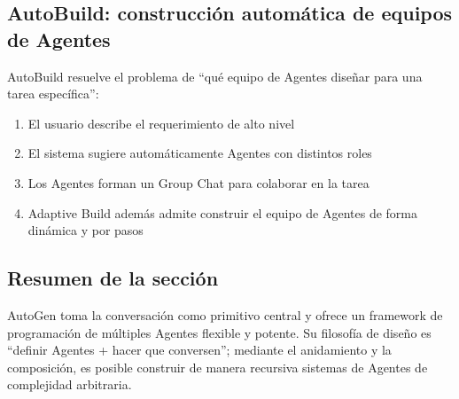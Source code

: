 \subsection{AutoBuild: construcción automática de equipos de Agentes}

AutoBuild resuelve el problema de ``qué equipo de Agentes diseñar para una tarea específica'':
\begin{enumerate}
    \item El usuario describe el requerimiento de alto nivel
    \item El sistema sugiere automáticamente Agentes con distintos roles
    \item Los Agentes forman un Group Chat para colaborar en la tarea
    \item Adaptive Build además admite construir el equipo de Agentes de forma dinámica y por pasos
\end{enumerate}

\subsection{Resumen de la sección}

AutoGen toma la conversación como primitivo central y ofrece un framework de programación de múltiples Agentes flexible y potente. Su filosofía de diseño es ``definir Agentes + hacer que conversen''; mediante el anidamiento y la composición, es posible construir de manera recursiva sistemas de Agentes de complejidad arbitraria.


